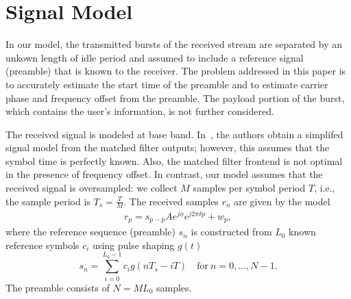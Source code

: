 \section{Signal Model}%
\label{sec:model}


In our model, the transmitted bursts of the received stream are separated by an unkown length of idle period and assumed to
include a reference signal (preamble) that is known to the receiver.
The problem addressed in this paper is to accurately estimate the
start time of the preamble and to estimate carrier phase and frequency
offset from the preamble. 
The payload portion of the burst, which contains the user's information, is not further considered. 

The received signal is modeled at base band.
In~\cite{Morelli_Mengali_98}, 
the authors obtain a simplifed signal model from the matched filter
outputs;
however, this assumes that the symbol time is perfectly known.
Also, the matched filter frontend is not optimal in the presence of
frequency offset.
In contrast, our model assumes that the received signal is
oversampled: we collect $M$ samples per symbol period $T$, i.e., the
sample period is $T_s=\frac{T}{M}$. 
The received samples $r_n$ are given by the model
\begin{equation}
    \begin{aligned}
      \label{eq:model}
      r_p = s_{p-\bar{p}}Ae^{j\phi}e^{j2\pi\delta p}+w_{p},
    \end{aligned}
  \end{equation}
where the reference sequence (preamble) $s_n$ is constructed from
$L_0$ known reference symbols $c_i$ using pulse shaping $g(t)$
\begin{equation}
  \label{eq:l_ref_sig_discrete}
  s_n=\sum_{i=0}^{L_0-1} c_i g(nT_s-iT) \quad \text{for}~n=0,\ldots,N-1.
\end{equation}
The preamble consists of $N=M L_0$ samples.  
  
